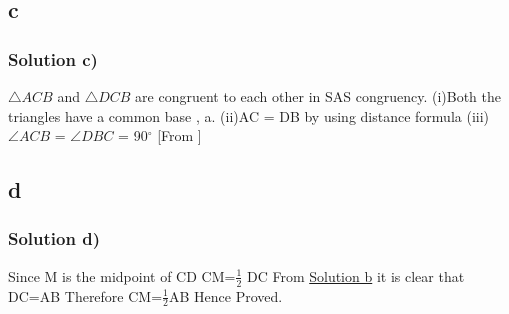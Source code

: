 \documentclass{beamer}
\begin{document}
\subsection{c}
\begin{frame}
\frametitle{Solution c)}
\label{c}
$\triangle ACB$ and $\triangle DCB$ are congruent to each other in SAS congruency.
(i)Both the triangles have a common base , a.
\newline
(ii)AC = DB by using distance formula
\newline
(iii)$\angle ACB$ = $\angle DBC$ = 90$^{\circ}$ [From \hyperlink{b}{}]

\end{frame}
\subsection{d}
\begin{frame}
\frametitle{Solution d)}
\label{d}
Since M is the midpoint of CD
\newline
CM=$\frac{1}{2}$ DC
From \hyperlink{b}{Solution b} it is clear that DC=AB
\newline
Therefore CM=$\frac{1}{2}$AB
\newline
Hence Proved.

\end{frame}
\end{document}
